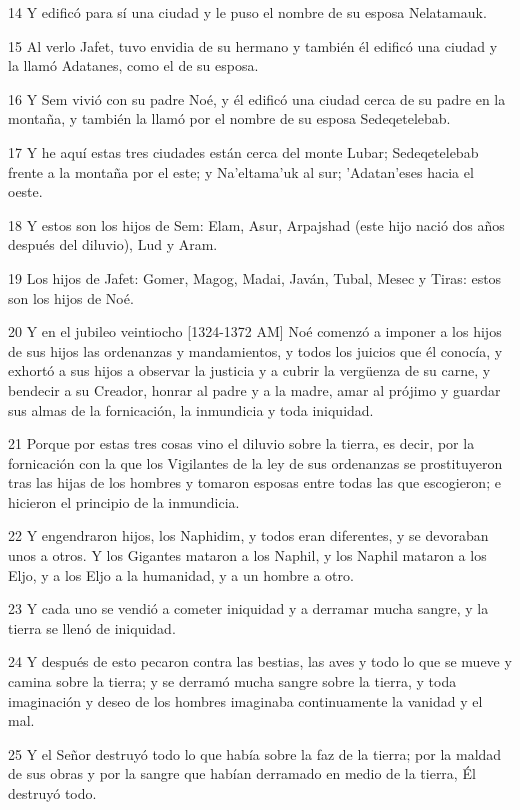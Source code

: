 \par 14 Y edificó para sí una ciudad y le puso el nombre de su esposa Nelatamauk.
\par 15 Al verlo Jafet, tuvo envidia de su hermano y también él edificó una ciudad y la llamó Adatanes, como el de su esposa.
\par 16 Y Sem vivió con su padre Noé, y él edificó una ciudad cerca de su padre en la montaña, y también la llamó por el nombre de su esposa Sedeqetelebab.
\par 17 Y he aquí estas tres ciudades están cerca del monte Lubar; Sedeqetelebab frente a la montaña por el este; y Na'eltama'uk al sur; 'Adatan'eses hacia el oeste.
\par 18 Y estos son los hijos de Sem: Elam, Asur, Arpajshad (este hijo nació dos años después del diluvio), Lud y Aram.
\par 19 Los hijos de Jafet: Gomer, Magog, Madai, Javán, Tubal, Mesec y Tiras: estos son los hijos de Noé.
\par 20 Y en el jubileo veintiocho [1324-1372 AM] Noé comenzó a imponer a los hijos de sus hijos las ordenanzas y mandamientos, y todos los juicios que él conocía, y exhortó a sus hijos a observar la justicia y a cubrir la vergüenza de su carne, y bendecir a su Creador, honrar al padre y a la madre, amar al prójimo y guardar sus almas de la fornicación, la inmundicia y toda iniquidad.
\par 21 Porque por estas tres cosas vino el diluvio sobre la tierra, es decir, por la fornicación con la que los Vigilantes de la ley de sus ordenanzas se prostituyeron tras las hijas de los hombres y tomaron esposas entre todas las que escogieron; e hicieron el principio de la inmundicia.
\par 22 Y engendraron hijos, los Naphidim, y todos eran diferentes, y se devoraban unos a otros. Y los Gigantes mataron a los Naphil, y los Naphil mataron a los Eljo, y a los Eljo a la humanidad, y a un hombre a otro.
\par 23 Y cada uno se vendió a cometer iniquidad y a derramar mucha sangre, y la tierra se llenó de iniquidad.
\par 24 Y después de esto pecaron contra las bestias, las aves y todo lo que se mueve y camina sobre la tierra; y se derramó mucha sangre sobre la tierra, y toda imaginación y deseo de los hombres imaginaba continuamente la vanidad y el mal.
\par 25 Y el Señor destruyó todo lo que había sobre la faz de la tierra; por la maldad de sus obras y por la sangre que habían derramado en medio de la tierra, Él destruyó todo.
